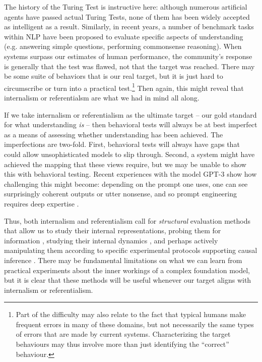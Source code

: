 The history of the Turing Test is instructive here: although numerous artificial agents have passed actual Turing Tests, none of them has been widely accepted as intelligent as a result. Similarly, in recent years, a number of benchmark tasks within NLP have been proposed to evaluate specific aspects of understanding (e.g. answering simple questions, performing commonsense reasoning). When systems surpass our estimates of human performance, the community’s response is generally that the test was flawed, not that the target was reached. There may be some suite of behaviors that is our real target, but it is just hard to circumscribe or turn into a practical test.\footnote{Part of the difficulty may also relate to the fact that typical humans make frequent errors in many of these domains, but not necessarily the same types of errors that are made by current systems. Characterizing the target behaviours may thus involve more than just identifying the ``correct'' behaviour.} Then again, this might reveal that internalism or referentialsm are what we had in mind all along.

If we take internalism or referentialism as the ultimate target – our gold standard for what understanding \textit{is} – then behavioral tests will always be at best imperfect as a means of assessing whether understanding has been achieved. The imperfections are two-fold. First, behavioral tests will always have gaps that could allow unsophisticated models to slip through. Second, a system might have achieved the mapping that these views require, but we may be unable to show this with behavioral testing. Recent experiences with the model GPT-3 show how challenging this might become: depending on the prompt one uses, one can see surprisingly coherent outputs or utter nonsense, and so prompt engineering requires deep expertise \citep{rong2021extrapolating}.

Thus, both internalism and referentialism call for \textit{structural} evaluation methods that allow us to study their internal representations, probing them for information \citep{tenney2019bert, manning2020emergent}, studying their internal dynamics \citep{sundararajan2017axiomatic},  and perhaps actively manipulating them according to specific experimental protocols supporting causal inference \citep{vig2020causal, geiger-etal-2020-neural}. There may be fundamental limitations on what we can learn from practical experiments about the inner workings of a complex foundation model, but it is clear that these methods will be useful whenever our target aligns with internalism or referentialism.

